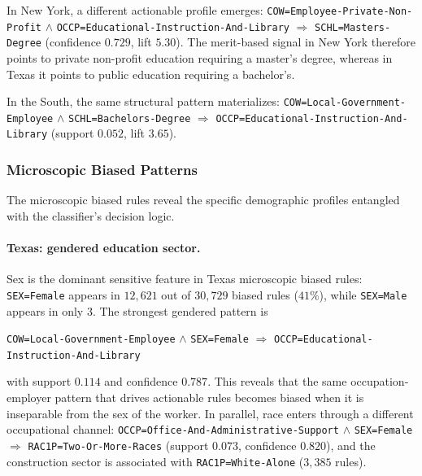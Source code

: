 In New York, a different actionable profile emerges: \texttt{COW=Employee-Private-Non-Profit} $\wedge$ \texttt{OCCP=Educational-Instruction-And-Library} $\Rightarrow$ \texttt{SCHL=Masters-Degree} (confidence $0.729$, lift $5.30$). The merit-based signal in New York therefore points to private non-profit education requiring a master's degree, whereas in Texas it points to public education requiring a bachelor's.

In the South, the same structural pattern materializes: \texttt{COW=Local-Government-Employee} $\wedge$ \texttt{SCHL=Bachelors-Degree} $\Rightarrow$ \texttt{OCCP=Educational-Instruction-And-Library} (support $0.052$, lift $3.65$).

\subsubsection{Microscopic Biased Patterns}

The microscopic biased rules reveal the specific demographic profiles entangled with the classifier's decision logic.

\paragraph{Texas: gendered education sector.} Sex is the dominant sensitive feature in Texas microscopic biased rules: \texttt{SEX=Female} appears in $12{,}621$ out of $30{,}729$ biased rules ($41\%$), while \texttt{SEX=Male} appears in only $3$. The strongest gendered pattern is
\begin{center}
\texttt{COW=Local-Government-Employee} $\wedge$ \texttt{SEX=Female} $\Rightarrow$ \texttt{OCCP=Educational-Instruction-And-Library}
\end{center}
with support $0.114$ and confidence $0.787$. This reveals that the same occupation-employer pattern that drives actionable rules becomes biased when it is inseparable from the sex of the worker. In parallel, race enters through a different occupational channel: \texttt{OCCP=Office-And-Administrative-Support} $\wedge$ \texttt{SEX=Female} $\Rightarrow$ \texttt{RAC1P=Two-Or-More-Races} (support $0.073$, confidence $0.820$), and the construction sector is associated with \texttt{RAC1P=White-Alone} ($3{,}385$ rules).

